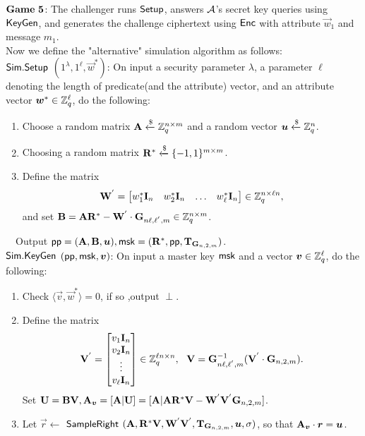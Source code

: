 $\mathbf{Game\ 5}$: The challenger runs $\mathsf{Setup}$, answers $\mathcal{A}$'s secret key queries using $\mathsf{KeyGen}$, and generates the challenge ciphertext using $\mathsf{Enc}$ with attribute $\vec{w}_{1}$ and message $m_{1}$.\\[0.2cm]
Now we define the "alternative" simulation algorithm as follows:\\[0.4cm]
$\mathsf{Sim}.\mathsf{Setup}$ $(1^{\lambda},1^{\ell},\vec{w}^{*})$: On input a security parameter $\lambda$, a parameter $\ell$ denoting the length of predicate(and the attribute) vector, and an attribute vector $\boldsymbol{w}^{*} \in \mathbb{Z}^{\ell}_{q}$, do the following:
\begin{enumerate}
\item Choose a random matrix $\mathbf{A} \xleftarrow {\$} \mathbb{Z}^{n \times m}_{q}$ and a random vector $\boldsymbol{u} \xleftarrow {\$} \mathbb{Z}^{n}_{q}$.\

\item Choosing a random matrix $\mathbf{R}^{*} \xleftarrow {\$} \{-1,1\}^{m \times m}$.\

\item Define the matrix
\begin{equation}
\mathbf{W}^{'}= \begin{bmatrix}
w^{*}_{1} \mathbf{I}_{n}&w^{*}_{2} \mathbf{I}_{n}&\ldots&w^{*}_{\ell} \mathbf{I}_{n}
\end{bmatrix} \in \mathbb{Z}^{n \times \ell n}_{q},
\end{equation}
and set $\mathbf{B}=\mathbf{A}\mathbf{R}^{*}-\mathbf{W}^{'}\cdot \mathbf{G}_{n\ell,\ell^{'},m} \in \mathbb{Z}^{n \times m}_{q}$.
\end{enumerate}
~~Output $\mathsf{pp}=(\mathbf{A}, \mathbf{B}, \boldsymbol{u}),\mathsf{msk}=(\mathbf{R}^{*}, \mathsf{pp}, \mathbf{T}_{\mathbf{G}_{n,2,m}})$.\\[0.4cm]
$\mathsf{Sim}.\mathsf{KeyGen}$ $(\mathsf{pp}, \mathsf{msk}, \boldsymbol{v})$: On input a master key $\mathsf{msk}$ and a vector $\boldsymbol{v} \in \mathbb{Z}^{\ell}_{q}$, do the following:
\begin{enumerate}
\item Check $\langle \vec{v}, \vec{w}^{*} \rangle =0$, if so ,output $\perp$.\

\item Define the matrix
\begin{equation}
\mathbf{V}^{'}= \begin{bmatrix}
v_{1} \mathbf{I}_{n}\\
v_{2} \mathbf{I}_{n}\\
\vdots\\
v_{\ell} \mathbf{I}_{n}
\end{bmatrix} \in \mathbb{Z}^{\ell n \times n}_{q},~~ \mathbf{V}=\mathbf{G}^{-1}_{n\ell,\ell^{'},m}(\mathbf{V}^{'} \cdot \mathbf{G}_{n,2,m}).
\end{equation}
Set $\mathbf{U}=\mathbf{BV}, \mathbf{A}_{\boldsymbol{v}}=[\mathbf{A}|\mathbf{U}]=[\mathbf{A}|\mathbf{A}\mathbf{R}^{*}\mathbf{V}-\mathbf{W}^{'}\mathbf{V}^{'}\mathbf{G}_{n,2,m}]$.\

\item Let $\vec{r}\leftarrow$ $\mathsf{SampleRight}$ $(\mathbf{A},\mathbf{R}^{*}\mathbf{V}, \mathbf{W}^{'}\mathbf{V}^{'}, \mathbf{T}_{\mathbf{G}_{n,2,m}}, \boldsymbol{u}, \sigma)$, so that $\mathbf{A}_{\boldsymbol{v}}\cdot \boldsymbol{r}=\boldsymbol{u}$.
\end{enumerate}
